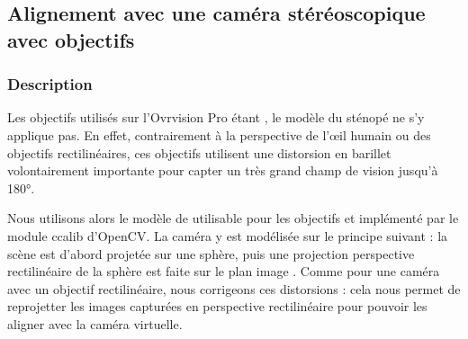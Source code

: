 \subsection{Alignement avec une caméra stéréoscopique avec objectifs }
\label{subsec:ovrvision_camera_calibration}

\subsubsection{Description}



Les objectifs utilisés sur l'Ovrvision Pro étant , le modèle du sténopé ne s'y applique pas. En effet, contrairement à la perspective de l'\oe il humain ou des objectifs rectilinéaires, ces objectifs utilisent une distorsion en barillet volontairement importante pour capter un très grand champ de vision jusqu'à \ang{180}.

Nous utilisons alors le modèle de \cite{Mei2007} utilisable pour les objectifs  et implémenté par le module ccalib d'OpenCV. La caméra y est modélisée sur le principe suivant : la scène est d'abord projetée sur une sphère, puis une projection perspective rectilinéaire de la sphère est faite sur le plan image . Comme pour une caméra avec un objectif rectilinéaire, nous corrigeons ces distorsions : cela nous permet de reprojetter les images capturées en perspective rectilinéaire pour pouvoir les aligner avec la caméra virtuelle.


